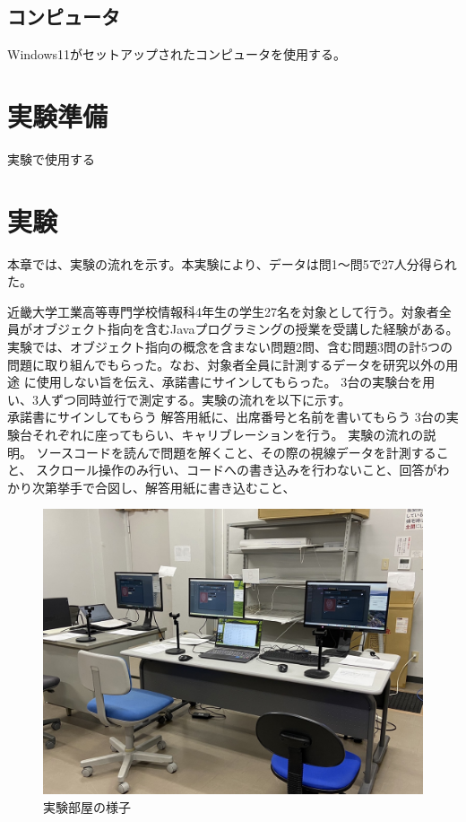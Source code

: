 \documentclass[paper=a4paper,fontsize=11pt]{jlreq}
\begin{document}
    \subsection{コンピュータ}
      Windows11がセットアップされたコンピュータを使用する。
  
  \section{実験準備}
    実験で使用する


  \section{実験}
    本章では、実験の流れを示す。本実験により、データは問1～問5で27人分得られた。

    近畿大学工業高等専門学校情報科4年生の学生27名を対象として行う。対象者全員がオブジェクト指向を含むJavaプログラミングの授業を受講した経験がある。\\
    実験では、オブジェクト指向の概念を含まない問題2問、含む問題3問の計5つの問題に取り組んでもらった。なお、対象者全員に計測するデータを研究以外の用途
    に使用しない旨を伝え、承諾書にサインしてもらった。
    3台の実験台を用い、3人ずつ同時並行で測定する。実験の流れを以下に示す。\\
    
    承諾書にサインしてもらう
    解答用紙に、出席番号と名前を書いてもらう
    3台の実験台それぞれに座ってもらい、キャリブレーションを行う。
    実験の流れの説明。
    ソースコードを読んで問題を解くこと、その際の視線データを計測すること、
    スクロール操作のみ行い、コードへの書き込みを行わないこと、回答がわかり次第挙手で合図し、解答用紙に書き込むこと、


    \begin{figure}[htbp]
      \centering
      \includegraphics[width=0.8\linewidth]{実験部屋.jpg}
      \caption{実験部屋の様子}
    \end{figure}
    \FloatBarrier
  
\end{document}
